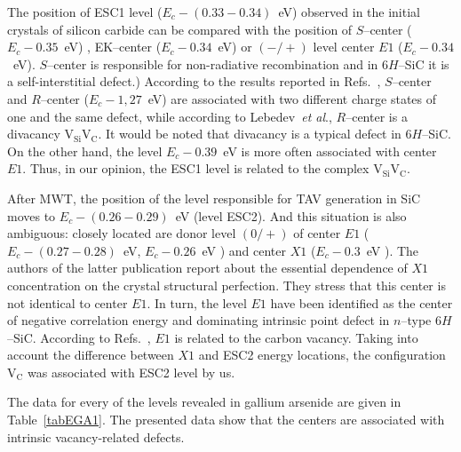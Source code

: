 \documentclass[%
 aip,jap,
 amsmath,amssymb,
 reprint,%
]{revtex4-1}
\begin{document}
The position of ESC1 level ($E_c-(0.33-0.34)$~eV) observed in the initial crystals of silicon carbide can be compared
with the position of $S$--center ($E_c-0.35$~eV) \cite{Lebed1999En,Anikin1991:2En,Anikin1991:3En},
EK–center ($E_c-0.34$~eV)\cite{Kuznets1997En}
or $(-/+)$ level center $E1$ ($E_c-0.34$~eV).\cite{Lebed1999En}
$S$--center is responsible for non-radiative recombination and
in 6$H$–SiC it is a self-interstitial defect.\cite{Lebed1999En})
According to the results reported in Refs.~,
$S$--center and $R$--center ($E_c-1,27$~eV) are associated with two different charge states
of one and the same defect,
while according to Lebedev~\emph{et al}.,\cite{Lebedev2000En}
$R$--center is a divacancy $\mathrm{V}_\mathrm{Si}\mathrm{V}_\mathrm{C}$.
It would be noted that  divacancy is a typical defect in 6$H$--SiC.\cite{SiCBaran,SiCDavid}
On the other hand, the level $E_c-0.39$~eV is more often associated with center $E1$.\cite{SiCWei,SiCKoizumi}
Thus, in our opinion, the ESC1 level is related to the  complex $\mathrm{V}_\mathrm{Si}\mathrm{V}_\mathrm{C}$.

After MWT, the position of the level responsible for TAV generation in SiC moves
to $E_c-(0.26-0.29)$~eV (level ESC2).
And this situation is also ambiguous: closely located are donor level $(0/+)$ of
center $E1$ ($E_c-(0.27-0.28)$~eV,\cite{Hemmingsson}
$E_c-0.26$~eV \cite{SiCWei,SiCKoizumi})
and center $X1$ ($E_c-0.3$~eV \cite{Lebedev2001En}).
The authors of the latter publication report about the essential dependence of $X1$ concentration on the crystal structural perfection.
They stress that this center is not identical to center $E1$.
In turn, the level $E1$ have been identified as the center of negative
correlation energy \cite{Lebedev2001En,SiCWei}
and dominating intrinsic point defect in $n$--type 6$H$--SiC.\cite{SiCSasaki}
According to Refs.~, $E1$ is related to the carbon vacancy.
Taking into account the difference between $X1$ and ESC2 energy locations,
the configuration $\mathrm{V}_\mathrm{C}$ was associated with ESC2 level by us.


The data for every of the levels revealed in gallium arsenide are given in Table~\ref{tabEGA1}.
The presented data show that the centers are associated with intrinsic vacancy-related defects.
\end{document}
